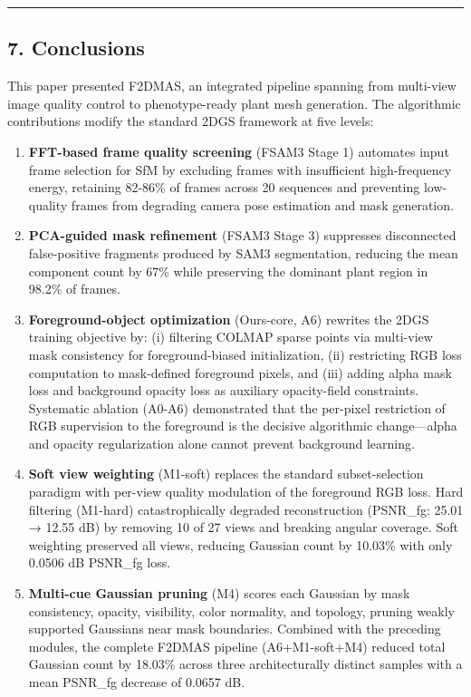 \documentclass[11pt,a4paper]{article}
\begin{document}
\begin{center}\rule{0.5\linewidth}{0.5pt}\end{center}

\subsection{7. Conclusions}\label{conclusions}

This paper presented F2DMAS, an integrated pipeline spanning from
multi-view image quality control to phenotype-ready plant mesh
generation. The algorithmic contributions modify the standard 2DGS
framework at five levels:

\begin{enumerate}
\def\labelenumi{\arabic{enumi}.}
\item
  \textbf{FFT-based frame quality screening} (FSAM3 Stage 1) automates
  input frame selection for SfM by excluding frames with insufficient
  high-frequency energy, retaining 82-86\% of frames across 20 sequences
  and preventing low-quality frames from degrading camera pose
  estimation and mask generation.
\item
  \textbf{PCA-guided mask refinement} (FSAM3 Stage 3) suppresses
  disconnected false-positive fragments produced by SAM3 segmentation,
  reducing the mean component count by 67\% while preserving the
  dominant plant region in 98.2\% of frames.
\item
  \textbf{Foreground-object optimization} (Ours-core, A6) rewrites the
  2DGS training objective by: (i) filtering COLMAP sparse points via
  multi-view mask consistency for foreground-biased initialization, (ii)
  restricting RGB loss computation to mask-defined foreground pixels,
  and (iii) adding alpha mask loss and background opacity loss as
  auxiliary opacity-field constraints. Systematic ablation (A0-A6)
  demonstrated that the per-pixel restriction of RGB supervision to the
  foreground is the decisive algorithmic change---alpha and opacity
  regularization alone cannot prevent background learning.
\item
  \textbf{Soft view weighting} (M1-soft) replaces the standard
  subset-selection paradigm with per-view quality modulation of the
  foreground RGB loss. Hard filtering (M1-hard) catastrophically
  degraded reconstruction (PSNR\_fg: 25.01 → 12.55 dB) by removing 10 of
  27 views and breaking angular coverage. Soft weighting preserved all
  views, reducing Gaussian count by 10.03\% with only 0.0506 dB PSNR\_fg
  loss.
\item
  \textbf{Multi-cue Gaussian pruning} (M4) scores each Gaussian by mask
  consistency, opacity, visibility, color normality, and topology,
  pruning weakly supported Gaussians near mask boundaries. Combined with
  the preceding modules, the complete F2DMAS pipeline (A6+M1-soft+M4)
  reduced total Gaussian count by 18.03\% across three architecturally
  distinct samples with a mean PSNR\_fg decrease of 0.0657 dB.
\end{enumerate}
\end{document}
